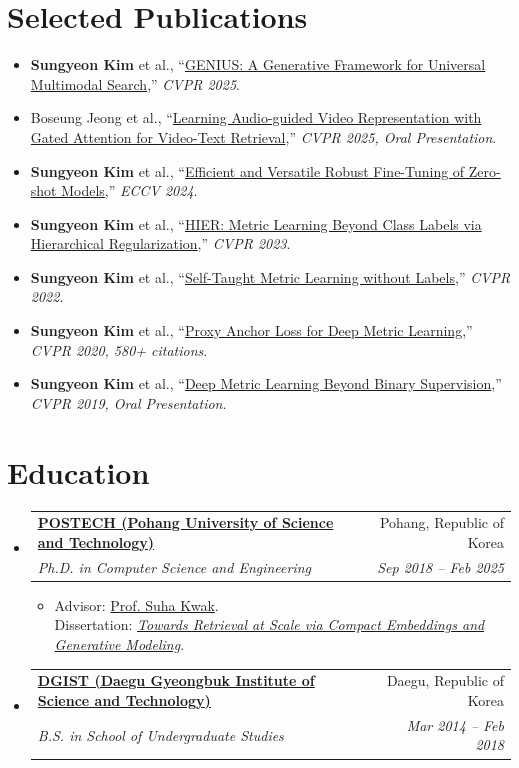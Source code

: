 \documentclass[letterpaper,11pt]{article}
\makeatletter
\newcommand{\resumeItem}[1]{
  \item\small{
    {#1 \vspace{-2pt}}
  }
}
\newcommand{\resumeSubheading}[4]{
  \vspace{-2pt}\item
    \begin{tabular*}{0.97\textwidth}[t]{l@{\extracolsep{\fill}}r}
      \textbf{#1} & #2 \\
      \textit{\small#3} & \textit{\small #4} \\
    \end{tabular*}\vspace{-6pt}
}
\newcommand{\resumeSubHeadingListStart}{\begin{itemize}[leftmargin=0.15in, label={}]}
\newcommand{\resumeSubHeadingListEnd}{\end{itemize}}
\newcommand{\resumeItemListStart}{\begin{itemize}}
\newcommand{\resumeItemListEnd}{\end{itemize}\vspace{-4pt}}
\makeatother
\begin{document}
\section{Selected Publications}
\resumeItemListStart
  \resumeItem{\textbf{Sungyeon Kim} et al., ``\href{https://arxiv.org/abs/2503.19868}{GENIUS: A Generative Framework for Universal Multimodal Search},'' \textit{CVPR 2025}.}
  \resumeItem{Boseung Jeong et al., ``\href{https://www.arxiv.org/abs/2504.02397}{Learning Audio-guided Video Representation with Gated Attention for Video-Text Retrieval},'' \textit{CVPR 2025, Oral Presentation}.}
  \resumeItem{\textbf{Sungyeon Kim} et al., ``\href{https://arxiv.org/abs/2408.05749}{Efficient and Versatile Robust Fine-Tuning of Zero-shot Models},'' \textit{ECCV 2024}.}
  \resumeItem{\textbf{Sungyeon Kim} et al., ``\href{https://arxiv.org/pdf/2212.14258.pdf}{HIER: Metric Learning Beyond Class Labels via Hierarchical Regularization},'' \textit{CVPR 2023}.}
  \resumeItem{\textbf{Sungyeon Kim} et al., ``\href{http://arxiv.org/abs/2205.01903}{Self-Taught Metric Learning without Labels},'' \textit{CVPR 2022}.}
  \resumeItem{\textbf{Sungyeon Kim} et al., ``\href{https://arxiv.org/abs/2003.13911}{Proxy Anchor Loss for Deep Metric Learning},'' \textit{CVPR 2020, 580+ citations}.}
  \resumeItem{\textbf{Sungyeon Kim} et al., ``\href{https://arxiv.org/abs/1904.09626}{Deep Metric Learning Beyond Binary Supervision},'' \textit{CVPR 2019, Oral Presentation}.}
\resumeItemListEnd

\section{Education}
\resumeSubHeadingListStart
  \resumeSubheading
    {\href{https://www.postech.ac.kr/eng/}{POSTECH (Pohang University of Science and Technology)}}{Pohang, Republic of Korea}
    {Ph.D. in Computer Science and Engineering}{Sep 2018 -- Feb 2025}
    \resumeItemListStart
      \resumeItem{Advisor: \href{http://cvlab.postech.ac.kr/~suhakwak/}{Prof. Suha Kwak}. \\
      Dissertation: \href{https://oasis.postech.ac.kr/handle/2014.oak/127450}{\textit{Towards Retrieval at Scale via Compact Embeddings and Generative Modeling}}.}
    \resumeItemListEnd

  \resumeSubheading
    {\href{https://www.dgist.ac.kr/en/}{DGIST (Daegu Gyeongbuk Institute of Science and Technology)}}{Daegu, Republic of Korea}
    {B.S. in School of Undergraduate Studies}{Mar 2014 -- Feb 2018}
\resumeSubHeadingListEnd
\end{document}
